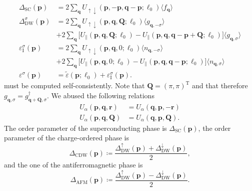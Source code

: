 \documentclass{article}
\begin{document}
\begin{align}
  \Delta_\mathrm{SC}(\mathbf{p}) &= 2 \sum_{\mathbf{q}} U_{\uparrow \downarrow} (\mathbf{p}, \mathbf{-p}, \mathbf{q} - \mathbf{p}; \ell_0) \langle f_{\mathbf{q}} \rangle \\
  \Delta_\mathrm{DW}^{\sigma} (\mathbf{p}) &= 2 \sum_{\mathbf{q}} U_{\uparrow \downarrow} (\mathbf{p}, \mathbf{q}, \mathbf{Q}; \ell_0) \langle g_{\mathbf{q}, -\sigma} \rangle \\
    &+ 2 \sum_{\mathbf{q}} \Big[  U_{\parallel} (\mathbf{p}, \mathbf{q}, \mathbf{Q}; \ell_0)  
     - U_{\parallel} (\mathbf{p}, \mathbf{q}, \mathbf{q} - \mathbf{p} + \mathbf{Q}; \ell_0) \Big] \langle g_{\mathbf{q}, \sigma} \rangle \\
  \varepsilon_\mathrm{I}^{\sigma}(\mathbf{p}) &= 2 \sum_{\mathbf{q}} U_{\uparrow \downarrow} (\mathbf{p}, \mathbf{q}, 0; \ell_0) \langle n_{\mathbf{q}, -\sigma} \rangle \\
    &+ 2 \sum_{\mathbf{q}} \Big[  U_{\parallel} (\mathbf{p}, \mathbf{q}, 0; \ell_0)  
     - U_{\parallel} (\mathbf{p}, \mathbf{q}, \mathbf{q} - \mathbf{p}; \ell_0) \Big] \langle n_{\mathbf{q}, \sigma} \rangle \\
  \varepsilon^\sigma (\mathbf{p}) &= \tilde{\varepsilon}(\mathbf{p}; \ell_0) + \varepsilon_\mathrm{I}^{\sigma}(\mathbf{p}).
\end{align}
must be computed self-consistently.
Note that $\mathbf{Q} = (\pi, \pi)^\mathrm{T}$ and that therefore $g_{\mathbf{q}, \sigma} = g_{\mathbf{q} + \mathbf{Q}, \sigma}^\dagger$.
We abused the following relations
\begin{align}
  U_{\alpha} (\mathbf{p}, \mathbf{q}, \mathbf{r}) &= U_{\alpha} (\mathbf{q}, \mathbf{p}, -\mathbf{r}) \\
  U_{\alpha} (\mathbf{p}, \mathbf{q}, \mathbf{Q}) &= U_{\alpha} (\mathbf{q}, \mathbf{p}, \mathbf{Q}).
\end{align}
The order parameter of the superconducting phase is $\Delta_\mathrm{SC}(\mathbf{p})$, the order parameter of the charge-ordered phase is 
\begin{equation}
  \Delta_\mathrm{CDW} (\mathbf{p}) \coloneqq \frac{ \Delta_\mathrm{DW}^{\uparrow}(\mathbf{p}) + \Delta_\mathrm{DW}^{\downarrow}(\mathbf{p}) }{2},
\end{equation}
and the one of the antiferromagnetic phase is
\begin{equation}
  \Delta_\mathrm{AFM} (\mathbf{p}) \coloneqq \frac{ \Delta_\mathrm{DW}^{\uparrow}(\mathbf{p}) - \Delta_\mathrm{DW}^{\downarrow}(\mathbf{p}) }{2}.
\end{equation}
\end{document}
